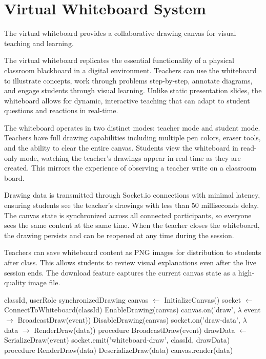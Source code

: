 \documentclass[onecolumn]{IEEEtran}
\begin{document}
\section{Virtual Whiteboard System}

The virtual whiteboard provides a collaborative drawing canvas for visual teaching and learning.

The virtual whiteboard replicates the essential functionality of a physical classroom blackboard in a digital environment. Teachers can use the whiteboard to illustrate concepts, work through problems step-by-step, annotate diagrams, and engage students through visual learning. Unlike static presentation slides, the whiteboard allows for dynamic, interactive teaching that can adapt to student questions and reactions in real-time.

The whiteboard operates in two distinct modes: teacher mode and student mode. Teachers have full drawing capabilities including multiple pen colors, eraser tools, and the ability to clear the entire canvas. Students view the whiteboard in read-only mode, watching the teacher's drawings appear in real-time as they are created. This mirrors the experience of observing a teacher write on a classroom board.

Drawing data is transmitted through Socket.io connections with minimal latency, ensuring students see the teacher's drawings with less than 50 milliseconds delay. The canvas state is synchronized across all connected participants, so everyone sees the same content at the same time. When the teacher closes the whiteboard, the drawing persists and can be reopened at any time during the session.

Teachers can save whiteboard content as PNG images for distribution to students after class. This allows students to review visual explanations even after the live session ends. The download feature captures the current canvas state as a high-quality image file.

\begin{algorithm}
\caption{Virtual Whiteboard Synchronization}
\begin{algorithmic}[1]
\REQUIRE classId, userRole
\ENSURE synchronizedDrawing
\STATE canvas $\leftarrow$ InitializeCanvas()
\STATE socket $\leftarrow$ ConnectToWhiteboard(classId)
\STATE EnableDrawing(canvas)
\STATE canvas.on('draw', $\lambda$ event $\rightarrow$ BroadcastDraw(event))
\ELSE
\STATE DisableDrawing(canvas)
\ENDIF
\STATE socket.on('draw-data', $\lambda$ data $\rightarrow$ RenderDraw(data))
\STATE procedure BroadcastDraw(event)
\STATE drawData $\leftarrow$ SerializeDraw(event)
\STATE socket.emit('whiteboard-draw', {classId, drawData})
\STATE procedure RenderDraw(data)
\STATE DeserializeDraw(data)
\STATE canvas.render(data)
\end{algorithmic}
\end{algorithm}
\end{document}
